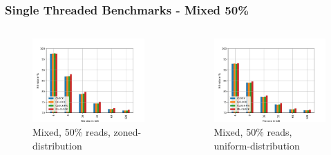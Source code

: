 \documentclass[
	aspectratio=169,
	compress,
]{beamer}
\newcommand{\navframetitle}[1]{\frametitle{#1\hfill{\footnotesize\lastsection{}}}}
\begin{document}
\begin{frame}[fragile]
	\navframetitle{Single Threaded Benchmarks - Mixed 50\%}

	\begin{columns}
		\begin{column}{0.5\textwidth}
			\begin{figure}
        		\includegraphics[width=\textwidth]{rw_50to50_zoned.jpg}
        		\caption{Mixed, 50\% reads, zoned-distribution}
			\end{figure}
		\end{column}
		\begin{column}{0.5\textwidth}
			\begin{figure}[ht]
    			\centering
    			\includegraphics[width=\textwidth]{rw_50to50_uniform.jpg}
        		\caption{Mixed, 50\% reads, uniform-distribution}
			\end{figure}			
		\end{column}
	\end{columns}
\end{frame}
\end{document}
